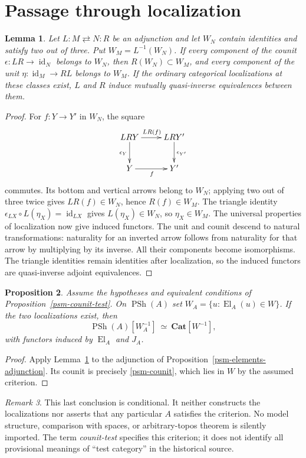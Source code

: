 \documentclass[11pt]{amsart}
\newtheorem{proposition}{Proposition}[section]
\newtheorem{lemma}[proposition]{Lemma}
\theoremstyle{remark}
\newtheorem{remark}[proposition]{Remark}
\newcommand{\PSh}{\operatorname{PSh}}
\newcommand{\El}{\operatorname{El}}
\newcommand{\Cat}{\mathbf{Cat}}
\newcommand{\id}{\operatorname{id}}
\newcommand{\PSM}[1]{\par\smallskip{\small\raggedright\noindent Source-map identifiers: \texttt{#1}.\par}\smallskip}
\begin{document}
\section{Passage through localization}
\label{psm-localization-section}

\begin{lemma}\label{psm-localization-counit}
Let $L:M\rightleftarrows N:R$ be an adjunction and let $W_N$ contain
identities and satisfy two out of three. Put $W_M=L^{-1}(W_N)$.
If every component of the counit $\epsilon:LR\to\id_N$ belongs to
$W_N$, then $R(W_N)\subset W_M$, and every component of the unit
$\eta:\id_M\to RL$ belongs to $W_M$. If the ordinary categorical
localizations at these classes exist, $L$ and $R$ induce mutually
quasi-inverse equivalences between them.
\end{lemma}
\PSM{PSM-LEM-0016}
\begin{proof}
For $f:Y\to Y'$ in $W_N$, the square
\[
 \xymatrix{
 LRY\ar[r]^{LR(f)}\ar[d]_{\epsilon_Y}&LRY'\ar[d]^{\epsilon_{Y'}}\\
 Y\ar[r]_f&Y'
 }
\]
commutes. Its bottom and vertical arrows belong to $W_N$; applying two
out of three twice gives $LR(f)\in W_N$, hence $R(f)\in W_M$.
The triangle identity
$\epsilon_{LX}\circ L(\eta_X)=\id_{LX}$ gives $L(\eta_X)\in W_N$,
so $\eta_X\in W_M$. The universal properties of localization now
give induced functors. The unit and counit descend to natural
transformations: naturality for an inverted arrow follows from naturality
for that arrow by multiplying by its inverse. All their components become
isomorphisms. The triangle identities remain identities after localization,
so the induced functors are quasi-inverse adjoint equivalences.
\end{proof}

\begin{proposition}\label{psm-test-localization}
Assume the hypotheses and equivalent conditions of
Proposition~\ref{psm-counit-test}. On $\PSh(A)$ set
$W_A=\{u:\El_A(u)\in W\}$. If the two localizations exist, then
\[
 \PSh(A)[W_A^{-1}]\ \simeq\ \Cat[W^{-1}],
\]
with functors induced by $\El_A$ and $J_A$.
\end{proposition}
\begin{proof}
Apply Lemma~\ref{psm-localization-counit} to the adjunction of
Proposition~\ref{psm-elements-adjunction}. Its counit is precisely
\eqref{psm-counit}, which lies in $W$ by the assumed criterion.
\end{proof}

\begin{remark}
This last conclusion is conditional. It neither constructs the
localizations nor asserts that any particular $A$ satisfies the criterion.
No model structure, comparison with spaces, or arbitrary-topos theorem is
silently imported. The term \emph{counit-test} specifies this criterion;
it does not identify all provisional meanings of ``test category'' in
the historical source.
\end{remark}
\end{document}
